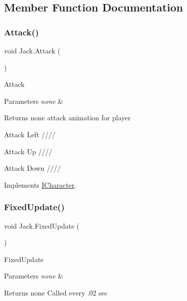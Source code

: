 \subsection{Member Function Documentation}
\mbox{\label{class_jack_a5c58f59b2bd9197a006a3e4739cc4503}} 
\subsubsection{\texorpdfstring{Attack()}{Attack()}}
{\footnotesize\ttfamily void Jack.\+Attack (\begin{DoxyParamCaption}{ }\end{DoxyParamCaption})\hspace{0.3cm}{\ttfamily [inline]}}

Attack 
\begin{DoxyParams}{Parameters}
{\em none} & \\
\hline
\end{DoxyParams}
\begin{DoxyReturn}{Returns}
none attack animation for player 
\end{DoxyReturn}
Attack Left ////

Attack Up ////

Attack Down //// 

Implements \mbox{\hyperlink{interface_i_character}{I\+Character}}.

\mbox{\label{class_jack_aba39628731cb774d63414f8b0702794b}} 
\subsubsection{\texorpdfstring{Fixed\+Update()}{FixedUpdate()}}
{\footnotesize\ttfamily void Jack.\+Fixed\+Update (\begin{DoxyParamCaption}{ }\end{DoxyParamCaption})\hspace{0.3cm}{\ttfamily [inline]}}

Fixed\+Update 
\begin{DoxyParams}{Parameters}
{\em none} & \\
\hline
\end{DoxyParams}
\begin{DoxyReturn}{Returns}
none Called every .02 sec 
\end{DoxyReturn}
\mbox{\label{class_jack_a50b5fbbb94e899db67599a763f9e687b}} 
